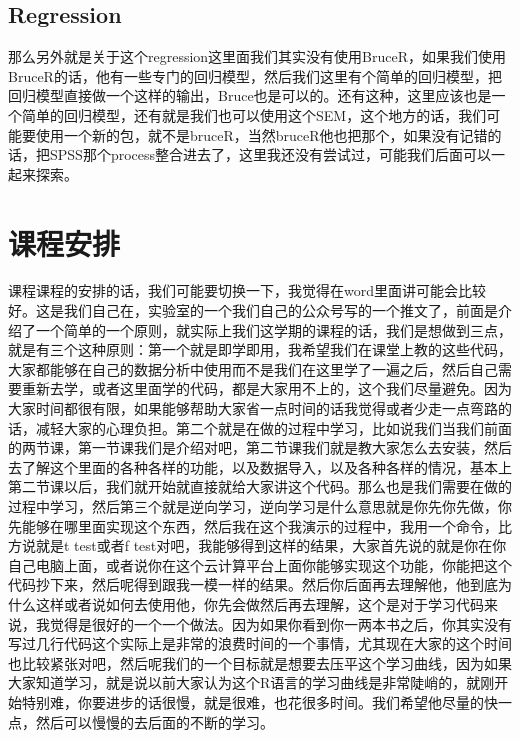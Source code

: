 \documentclass[
  oneside]{book}
\begin{document}
\hypertarget{regression}{%
\subsection{Regression}\label{regression}}

那么另外就是关于这个regression这里面我们其实没有使用BruceR，如果我们使用BruceR的话，他有一些专门的回归模型，然后我们这里有个简单的回归模型，把回归模型直接做一个这样的输出，Bruce也是可以的。还有这种，这里应该也是一个简单的回归模型，还有就是我们也可以使用这个SEM，这个地方的话，我们可能要使用一个新的包，就不是bruceR，当然bruceR他也把那个，如果没有记错的话，把SPSS那个process整合进去了，这里我还没有尝试过，可能我们后面可以一起来探索。

\hypertarget{ux8bfeux7a0bux5b89ux6392}{%
\section{课程安排}\label{ux8bfeux7a0bux5b89ux6392}}

课程课程的安排的话，我们可能要切换一下，我觉得在word里面讲可能会比较好。这是我们自己在，实验室的一个我们自己的公众号写的一个推文了，前面是介绍了一个简单的一个原则，就实际上我们这学期的课程的话，我们是想做到三点，就是有三个这种原则：第一个就是即学即用，我希望我们在课堂上教的这些代码，大家都能够在自己的数据分析中使用而不是我们在这里学了一遍之后，然后自己需要重新去学，或者这里面学的代码，都是大家用不上的，这个我们尽量避免。因为大家时间都很有限，如果能够帮助大家省一点时间的话我觉得或者少走一点弯路的话，减轻大家的心理负担。第二个就是在做的过程中学习，比如说我们当我们前面的两节课，第一节课我们是介绍对吧，第二节课我们就是教大家怎么去安装，然后去了解这个里面的各种各样的功能，以及数据导入，以及各种各样的情况，基本上第二节课以后，我们就开始就直接就给大家讲这个代码。那么也是我们需要在做的过程中学习，然后第三个就是逆向学习，逆向学习是什么意思就是你先你先做，你先能够在哪里面实现这个东西，然后我在这个我演示的过程中，我用一个命令，比方说就是t test或者f test对吧，我能够得到这样的结果，大家首先说的就是你在你自己电脑上面，或者说你在这个云计算平台上面你能够实现这个功能，你能把这个代码抄下来，然后呢得到跟我一模一样的结果。然后你后面再去理解他，他到底为什么这样或者说如何去使用他，你先会做然后再去理解，这个是对于学习代码来说，我觉得是很好的一个一个做法。因为如果你看到你一两本书之后，你其实没有写过几行代码这个实际上是非常的浪费时间的一个事情，尤其现在大家的这个时间也比较紧张对吧，然后呢我们的一个目标就是想要去压平这个学习曲线，因为如果大家知道学习，就是说以前大家认为这个R语言的学习曲线是非常陡峭的，就刚开始特别难，你要进步的话很慢，就是很难，也花很多时间。我们希望他尽量的快一点，然后可以慢慢的去后面的不断的学习。
\end{document}
